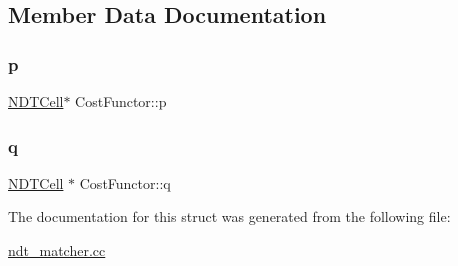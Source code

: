 \subsection{Member Data Documentation}
\mbox{\label{structCostFunctor_a226fe7b0cb5dab732c9418d9d6d36cc9}} 
\subsubsection{\texorpdfstring{p}{p}}
{\footnotesize\ttfamily \hyperlink{classNDTCell}{N\+D\+T\+Cell}$\ast$ Cost\+Functor\+::p}

\mbox{\label{structCostFunctor_aced002cbe4f5b36d02e36f460de4c89f}} 
\subsubsection{\texorpdfstring{q}{q}}
{\footnotesize\ttfamily \hyperlink{classNDTCell}{N\+D\+T\+Cell} $\ast$ Cost\+Functor\+::q}



The documentation for this struct was generated from the following file\+:\begin{DoxyCompactItemize}
\item 
\hyperlink{ndt__matcher_8cc}{ndt\+\_\+matcher.\+cc}\end{DoxyCompactItemize}
